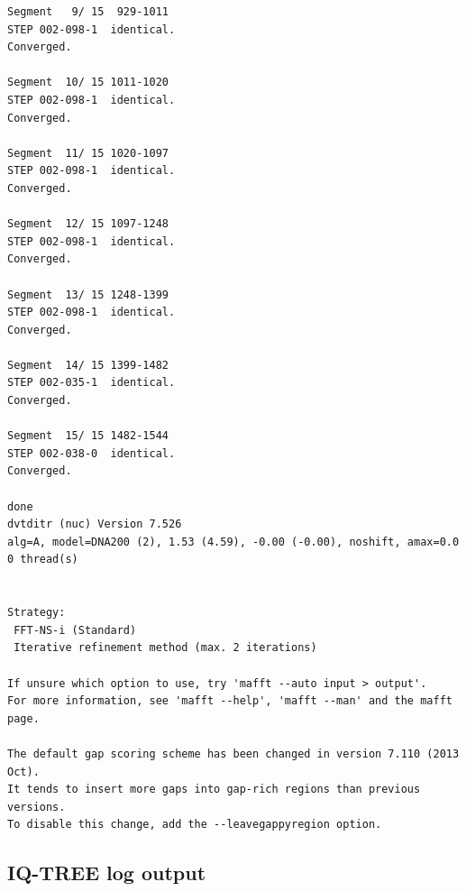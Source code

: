\documentclass{article}
\begin{document}
\begin{verbatim}
Segment   9/ 15  929-1011
STEP 002-098-1  identical.
Converged.

Segment  10/ 15 1011-1020
STEP 002-098-1  identical.
Converged.

Segment  11/ 15 1020-1097
STEP 002-098-1  identical.
Converged.

Segment  12/ 15 1097-1248
STEP 002-098-1  identical.
Converged.

Segment  13/ 15 1248-1399
STEP 002-098-1  identical.
Converged.

Segment  14/ 15 1399-1482
STEP 002-035-1  identical.
Converged.

Segment  15/ 15 1482-1544
STEP 002-038-0  identical.
Converged.

done
dvtditr (nuc) Version 7.526
alg=A, model=DNA200 (2), 1.53 (4.59), -0.00 (-0.00), noshift, amax=0.0
0 thread(s)


Strategy:
 FFT-NS-i (Standard)
 Iterative refinement method (max. 2 iterations)

If unsure which option to use, try 'mafft --auto input > output'.
For more information, see 'mafft --help', 'mafft --man' and the mafft page.

The default gap scoring scheme has been changed in version 7.110 (2013 Oct).
It tends to insert more gaps into gap-rich regions than previous versions.
To disable this change, add the --leavegappyregion option.
\end{verbatim}

\subsection{IQ-TREE log output}
\end{document}

